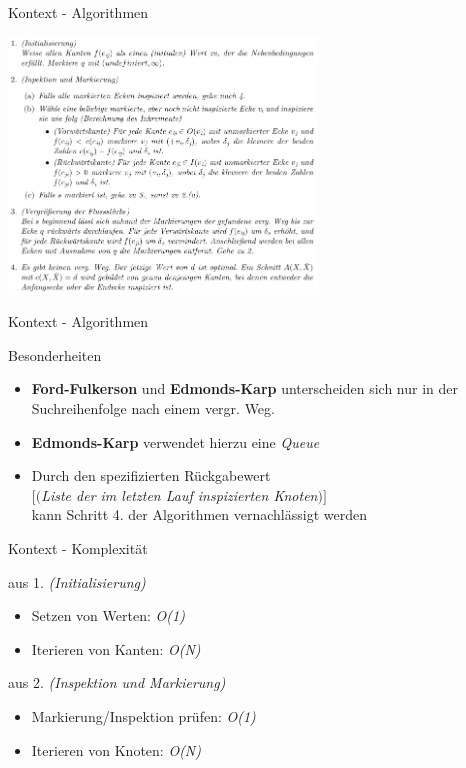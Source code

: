 \documentclass{beamer}
\begin{document}
    \begin{frame}{Kontext - Algorithmen}
        \begin{center}
            \includegraphics[height=6.8cm]{../algorithmus.PNG}
        \end{center}
    \end{frame}

    \begin{frame}{Kontext - Algorithmen}
        \begin{block}{Besonderheiten}
            \begin{itemize}
                \item \textbf{Ford-Fulkerson} und \textbf{Edmonds-Karp} unterscheiden sich nur in der Suchreihenfolge nach einem vergr. Weg.
                \item \textbf{Edmonds-Karp} verwendet hierzu eine \textit{Queue}
                \item Durch den spezifizierten R\"uckgabewert\\
                $[($\textit{Liste der im letzten Lauf inspizierten Knoten}$)]$\\
                kann Schritt 4. der Algorithmen vernachl\"assigt werden
            \end{itemize}
        \end{block}
    \end{frame}

    \begin{frame}{Kontext - Komplexit\"at}
        \begin{block}{aus 1. \textit{(Initialisierung)}}
            \begin{itemize}
                \item Setzen von Werten: \textit{O(1)}
                \item Iterieren von Kanten: \textit{O(N)}
            \end{itemize}
        \end{block}
        \begin{block}{aus 2. \textit{(Inspektion und Markierung)}}
            \begin{itemize}
                \item Markierung/Inspektion pr\"ufen: \textit{O(1)}
                \item Iterieren von Knoten: \textit{O(N)}
            \end{itemize}
        \end{block}
    \end{frame}
\end{document}
